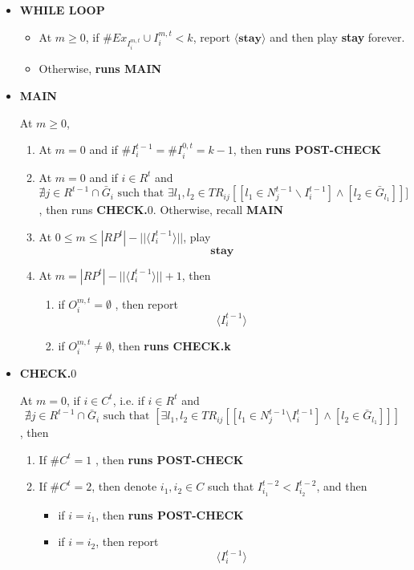 \documentclass[12pt,letter]{article}
\theoremstyle{definition}
\theoremstyle{remark}
\theoremstyle{claim}
\begin{document}
\begin{itemize}

\item \textbf{WHILE LOOP}
\begin{itemize}
\item At $m\geq 0$, if $\# Ex_{I^{m,t}_i}\cup I^{m,t}_i< k$, report $\langle \textbf{stay} \rangle$ and then play \textbf{stay} forever.
\item Otherwise, \textbf{runs MAIN }
\end{itemize}


\item \textbf{MAIN}

At $m\geq 0$, 

\begin{enumerate}
\item At $m=0$ and if $\# I^{t-1}_i=\# I^{0,t}_i= k-1$, then 
\textbf{runs POST-CHECK }


\item At $m=0$ and if $i\in R^t$ and
\[\nexists j\in R^{t-1}\cap\bar{G}_i \text{ such that }\exists l_1,l_2\in TR_{ij}[[l_1\in N^{t-1}_j\backslash I^{t-1}_i] \wedge [l_2\in \bar{G}_{l_1}]]]\]
, then runs \textbf{CHECK.$0$}. Otherwise, recall \textbf{MAIN}
\item At $0\leq m \leq |RP^t|-||\langle I^{t-1}_i \rangle||$, play
\[\textbf{stay}\]
\item At $m = |RP^t|-||\langle I^{t-1}_i \rangle||+1$, then
\begin{enumerate}
\item if $O^{m,t}_i= \emptyset$ 
, then report
\[\langle I^{t-1}_i \rangle\]
\item if $O^{m,t}_i\neq \emptyset$, then \textbf{runs CHECK.k}

\end{enumerate}

\end{enumerate}





\item \textbf{CHECK.$0$}

At $m=0$, if $i\in C^t$, i.e. if $i\in R^t$ and
\[\nexists j\in R^{t-1}\cap \bar{G}_i \text{ such that }[\exists l_1,l_2\in TR_{ij}[[l_1\in N^{t-1}_j\setminus I^{t-1}_i] \wedge [l_2\in \bar{G}_{l_1}]]]\]
, then
\begin{enumerate}
\item If $\#C^t=1$
, then 
\textbf{runs POST-CHECK }

\item If $\#C^t=2$, then denote $i_1,i_2\in C$ such that $I^{t-2}_{i_1}<I^{t-2}_{i_2}$, and then
\begin{itemize}
\item if $i=i_1$, then 
\textbf{runs POST-CHECK }
\item if $i=i_2$, then report
\[\langle I^{t-1}_i \rangle\]


\end{itemize}
\end{enumerate}
\end{itemize}
\end{document}
